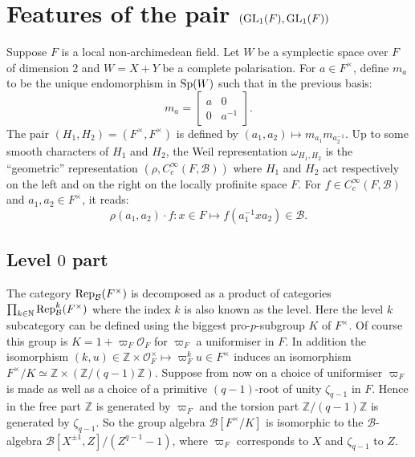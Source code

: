 \documentclass[11pt]{article}
\theoremstyle{plain}
\theoremstyle{definition}
\theoremstyle{plain}
\theoremstyle{definition}
\theoremstyle{plain}
\begin{document}
\section{Features of the pair $(\textup{GL}_1(F),\textup{GL}_1(F))$} \label{features_GL1_GL1_section}

Suppose $F$ is a local non-archimedean field. Let $W$ be a symplectic space over $F$ of dimension $2$ and $W=X+Y$ be a complete polarisation. For $a \in F^\times$, define $m_a$ to be the unique endomorphism in $\textup{Sp}(W)$ such that in the previous basis:
$$m_a = \left[ \begin{array}{cl}
a & 0 \\
0 & a^{-1}
\end{array} \right].$$
The pair $(H_1,H_2)=(F^\times,F^\times)$ is defined by $(a_1,a_2) \mapsto m_{a_1} m_{a_2^{-1}}$. Up to some smooth characters of $H_1$ and $H_2$, the Weil representation $\omega_{H_1,H_2}$ is the ``geometric'' representation $(\rho,C_c^\infty(F,\mathcal{B}))$ where $H_1$ and $H_2$ act respectively on the left and on the right on the locally profinite space $F$. For $f \in C_c^\infty(F,\mathcal{B})$ and $a_1, a_2 \in F^\times$, it reads:
$$\rho(a_1,a_2) \cdot f : x \in F \mapsto  f(a_1^{-1} x a_2) \in \mathcal{B}.$$

\subsection{Level $0$ part}

The category $\textup{Rep}_\mathcal{B}(F^\times)$ is decomposed as a product of categories $\prod_{k \in \mathbb{N}} \textup{Rep}_\mathcal{B}^k(F^\times)$ where the index $k$ is also known as the level. Here the level $k$ subcategory can be defined using the biggest pro-$p$-subgroup $K$ of $F^\times$. Of course this group is $K=1 + \varpi_F \mathcal{O}_F$ for $\varpi_F$ a uniformiser in $F$. In addition the isomorphism $(k,u) \in \mathbb{Z} \times \mathcal{O}_F^\times \mapsto \varpi_F^k u \in F^\times$ induces an isomorphism $F^\times / K \simeq \mathbb{Z} \times (\mathbb{Z}/ (q-1) \mathbb{Z})$. Suppose from now on a choice of uniformiser $\varpi_F$ is made as well as a choice of a primitive $(q-1)$-root of unity $\zeta_{q-1}$ in $F$. Hence in the free part $\mathbb{Z}$ is generated by $\varpi_F$ and the torsion part $\mathbb{Z}/(q-1) \mathbb{Z}$ is generated by $\zeta_{q-1}$. So the group algebra $\mathcal{B}[F^\times/K]$ is isomorphic to the $\mathcal{B}$-algebra $\mathcal{B}[X^{\pm 1 },Z]/(Z^{q-1}-1)$, where $\varpi_F$ corresponds to $X$ and $\zeta_{q-1}$ to $Z$.
\end{document}
